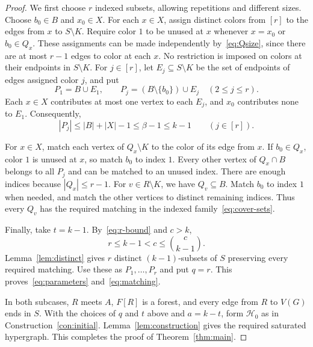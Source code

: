 \documentclass[11pt,a4paper]{article}
\numberwithin{equation}{section}
\theoremstyle{definition}
\theoremstyle{plain}
\newcommand{\HH}{\mathcal H}
\begin{document}
\begin{proof}
We first choose $r$ indexed subsets, allowing repetitions and different
sizes. Choose $b_0\in B$ and $x_0\in X$.
For each $x\in X$, assign distinct colors from $[r]$ to the edges
from $x$ to $S\setminus K$. Require color $1$ to be unused at $x$
whenever $x=x_0$ or $b_0\in Q_x$.
These assignments can be made independently by~\eqref{eq:Qsize},
since there are at most $r-1$ edges to color at each $x$.
No restriction is imposed on colors at their endpoints in $S\setminus K$.
For $j\in[r]$, let $E_j\subseteq S\setminus K$ be the set of
endpoints of edges assigned color $j$, and put
\begin{equation}\label{eq:cover-sets}
 P_1=B\cup E_1,\qquad
 P_j=(B\setminus\{b_0\})\cup E_j\quad(2\le j\le r).
\end{equation}
Each $x\in X$ contributes at most one vertex to each $E_j$, and $x_0$
contributes none to $E_1$. Consequently,
\begin{equation}\label{eq:cover-size}
 |P_j|\le |B|+|X|-1\le\beta-1\le k-1\qquad(j\in[r]).
\end{equation}

For $x\in X$, match each vertex of $Q_x\setminus K$ to the color
of its edge from $x$. If $b_0\in Q_x$, color $1$ is unused at $x$,
so match $b_0$ to index $1$. Every other vertex of $Q_x\cap B$
belongs to all $P_j$ and can be matched to an unused index.
There are enough indices because $|Q_x|\le r-1$.
For $v\in R\setminus K$, we have $Q_v\subseteq B$.
Match $b_0$ to index $1$ when needed, and match the other vertices
to distinct remaining indices. Thus every $Q_v$ has the required
matching in the indexed family~\eqref{eq:cover-sets}.

Finally, take $t=k-1$. By~\eqref{eq:r-bound} and $c>k$,
\[
 r\le k-1<c\le\binom c{k-1}.
\]
Lemma~\ref{lem:distinct} gives $r$ distinct $(k-1)$-subsets of $S$
preserving every required matching. Use these as $P_1,\ldots,P_r$
and put $q=r$. This proves~\eqref{eq:parameters} and~\eqref{eq:matching}.

In both subcases, $R$ meets $A$, $F[R]$ is a forest, and every edge
from $R$ to $V(G)$ ends in $S$. With the choices of $q$ and $t$
above and $a=k-t$, form $\HH_0$ as in Construction~\ref{con:initial}.
Lemma~\ref{lem:construction} gives the required saturated hypergraph.
This completes the proof of Theorem~\ref{thm:main}.
\end{proof}

\end{document}
